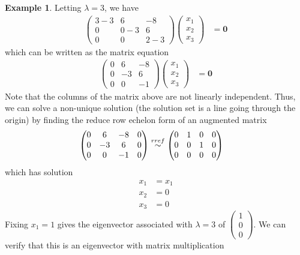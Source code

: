 \documentclass[
]{book}
\theoremstyle{definition}
\theoremstyle{definition}
\newtheorem{example}{Example}[chapter]
\theoremstyle{definition}
\theoremstyle{definition}
\theoremstyle{remark}
\begin{document}
\begin{example}
Letting \(\lambda = 3\), we have
\[
\begin{aligned}
\begin{pmatrix} 
3  - 3 & 6 & -8 \\
0 & 0 - 3 & 6 \\
0 & 0 & 2 - 3
\end{pmatrix} \begin{pmatrix} x_1 \\ x_2 \\ x_3 \end{pmatrix} & = \mathbf{0}
\end{aligned}
\]
which can be written as the matrix equation
\[
\begin{aligned}
\begin{pmatrix} 0 & 6 & -8 \\ 0 & -3 & 6 \\ 0 & 0 & -1 \end{pmatrix} \begin{pmatrix} x_1 \\ x_2 \\ x_3 \end{pmatrix} & = \mathbf{0}
\end{aligned}
\]
Note that the columns of the matrix above are not linearly independent. Thus, we can solve a non-unique solution (the solution set is a line going through the origin) by finding the reduce row echelon form of an augmented matrix
\[
\begin{aligned}
\begin{pmatrix} 0 & 6 & -8 & 0 \\ 0 & -3 & 6 & 0 \\ 0 & 0 & -1 & 0 \end{pmatrix} & \stackrel{rref}{\huge \sim} \begin{pmatrix} 0 & 1 & 0 & 0 \\ 0 & 0 & 1 & 0 \\ 0 & 0 & 0 & 0 \end{pmatrix}
\end{aligned}
\]
which has solution
\[
\begin{aligned}
x_1 & = x_1 \\
x_2 & = 0 \\
x_3 & = 0
\end{aligned}
\]
Fixing \(x_1 = 1\) gives the eigenvector associated with \(\lambda = 3\) of \(\begin{pmatrix} 1 \\ 0 \\ 0 \end{pmatrix}\). We can verify that this is an eigenvector with matrix multiplication

\end{example}
\end{document}
